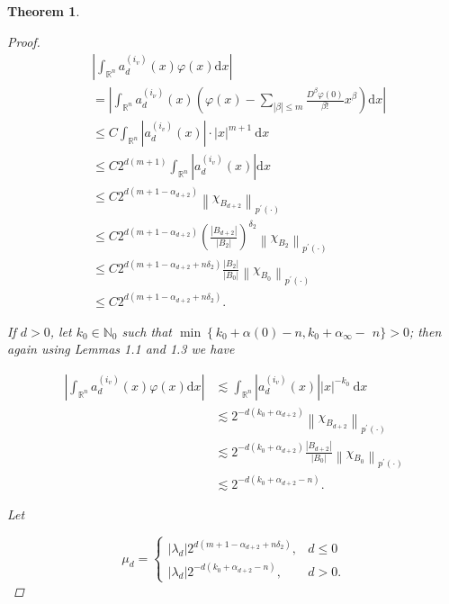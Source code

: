 \documentclass[oneside,reqno]{amsart}
\newtheorem{theorem}{Theorem}[section]
\numberwithin{equation}{section}
\theoremstyle{definition}
\begin{document}
\begin{theorem}
\begin{proof}
\begin{align*}
& \left|\int_{\mathbb{R}^{n}} a_{d}^{\left(i_{v}\right)}(x) \varphi(x) \mathrm{d} x\right| \\
& =\left|\int_{\mathbb{R}^{n}} a_{d}^{\left(i_{\nu}\right)}(x)\left(\varphi(x)-\sum_{|\beta| \leq  m} \frac{D^{\beta} \varphi(0)}{\beta !} x^{\beta}\right) \mathrm{d} x\right| \\
& \leq C\int_{\mathbb{R}^{n}}\left|a_{d}^{\left(i_{v}\right)}(x)\right| \cdot|x|^{m+1} \mathrm{~d} x \\
& \leq C 2^{d(m+1)} \int_{\mathbb{R}^{n}}\left|a_{d}^{\left(i_{v}\right)}(x)\right| \mathrm{d} x \\
& \leq C 2^{d\left(m+1-\alpha_{d+2}\right)}\left\|\chi_{B_{d+2}}\right\|_{{p^{\prime}(\cdot)}} \\
& \leq C 2^{d\left(m+1-\alpha_{d+2}\right)}\left(\frac{\left|B_{d+2}\right|}{\left|B_{2}\right|}\right)^{\delta_{2}}\left\|\chi_{B_{2}}\right\|_{{p^{\prime}(\cdot)}} \\
& \leq C 2^{d\left(m+1-\alpha_{d+2}+n \delta_{2}\right)} \frac{\left|B_{2}\right|}{\left|B_{0}\right|}\left\|\chi_{B_{0}}\right\|_{{p^{\prime} (\cdot)}} \\
& \leq C 2^{d\left(m+1-\alpha_{d+2}+n \delta_{2}\right)} .
\end{align*}


If $d>0$, let $k_{0} \in \mathbb{N}_{0}$ such that $\min \left\{k_{0}+\alpha(0)-n, k_{0}+\alpha_{\infty}-\right.$ $n\}>0$; then again using Lemmas 1.1 and 1.3 we have


\begin{align*}
\left|\int_{\mathbb{R}^{n}} a_{d}^{\left(i_{v}\right)}(x) \varphi(x) \mathrm{d} x\right| & \lesssim \int_{\mathbb{R}^{n}}\left|a_{d}^{\left(i_{v}\right)}(x)\right||x|^{-k_{0}} \mathrm{~d} x \\
& \lesssim 2^{-d\left(k_{0}+\alpha_{d+2}\right)}\left\|\chi_{B_{d+2}}\right\|_{{p^{\prime}(\cdot)}} \\
& \lesssim 2^{-d\left(k_{0}+\alpha_{d+2}\right)} \frac{\left|B_{d+2}\right|}{\left|B_{0}\right|}\left\|\chi_{B_{0}}\right\|_{{p^{\prime}(\cdot)}} \\
& \lesssim 2^{-d\left(k_{0}+\alpha_{d+2}-n\right)} .
\end{align*}


Let

\[
\mu_{d}= \begin{cases}\left|\lambda_{d}\right| 2^{d\left(m+1-\alpha_{d+2}+n \delta_{2}\right)}, & d \leq  0  \\ \left|\lambda_{d}\right| 2^{-d\left(k_{0}+\alpha_{d+2}-n\right)}, & d>0 .\end{cases}
\]


\end{proof}
\end{theorem}
\end{document}

